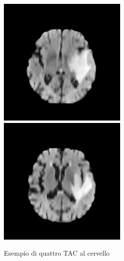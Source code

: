 \begin{figure}[!htb]
	\label{fig:immagine2}
	\endminipage\hfill
	\includegraphics[width=\linewidth]{image/Image3.jpg}
	\label{fig:immagine3}
	\endminipage\hfill
	\includegraphics[width=\linewidth]{image/Image4.jpg}
	\label{fig:immagine04}
	\endminipage
	\caption{Esempio di quattro TAC al cervello}
\end{figure}

